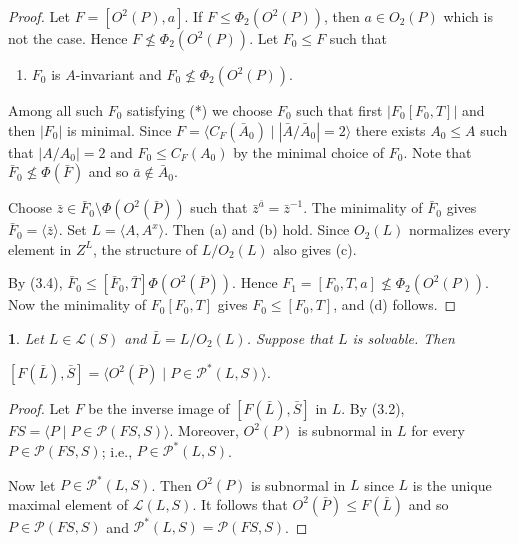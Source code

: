 \documentclass[11pt]{article}
\theoremstyle{plain}
\theoremstyle{stmplain}
\newtheorem{stm}{}[section]
\newcommand{\disp}[1]{\begin{center}$\displaystyle #1$\end{center}}
\begin{document}
\begin{proof}
Let $F = [O^2(P), a]$. If $F \le \Phi_2(O^2(P))$, then $a \in O_2(P)$ which is
not the case. Hence $F \nleq \Phi_2(O^2(P))$. Let $F_0 \le F$ such that
\begin{enumerate}
\item[(*)] $F_0$ is $A$-invariant and $F_0 \nleq \Phi_2(O^2(P))$.
\end{enumerate}
Among all such $F_0$ satisfying (*) we choose $F_0$ such that first
$|F_0[F_0, T]|$ and then $|F_0|$ is minimal. Since $F = \langle C_F(\bar{A}_0)
\mid |\bar{A}/\bar{A}_0| = 2 \rangle$ there exists $A_0 \le A$ such that
$|A/A_0| = 2$ and $F_0 \le C_F(A_0)$ by the minimal choice of $F_0$. Note that
$\bar{F}_0 \nleq \Phi(\bar{F})$ and so $\bar{a} \notin \bar{A}_0$.

\smallskip
\noindent Choose $\bar{z} \in \bar{F}_0 \setminus \Phi(O^2(\bar{P}))$ such that
$\bar{z}^{\bar{a}} = \bar{z}^{-1}$. The minimality of $\bar{F}_0$ gives
$\bar{F}_0 = \langle \bar{z} \rangle$. Set $L = \langle A, A^x \rangle$. Then
(a) and (b) hold. Since $O_2(L)$ normalizes every element in $Z^L$, the
structure of $L/O_2(L)$ also gives (c).

\smallskip
\noindent By (3.4), $\bar{F}_0 \le [\bar{F}_0, \bar{T}]\Phi(O^2(\bar{P}))$. Hence
$F_1 = [F_0, T, a] \nleq \Phi_2(O^2(P))$. Now the minimality of $F_0[F_0, T]$
gives $F_0 \le [F_0, T]$, and (d) follows.
\end{proof}

\begin{stm}\label{st:3.7}
Let $L \in \mathcal{L}(S)$ and $\bar{L} = L/O_2(L)$. Suppose that $L$ is
solvable. Then
\disp{[F(\bar{L}), \bar{S}] = \langle O^2(\bar{P}) \mid P \in \mathcal{P}^*(L, S) \rangle.}
\end{stm}

\begin{proof}
Let $F$ be the inverse image of $[F(\bar{L}), \bar{S}]$ in $L$. By (3.2), $FS =
\langle P \mid P \in \mathcal{P}(FS, S) \rangle$. Moreover, $O^2(P)$ is
subnormal in $L$ for every $P \in \mathcal{P}(FS, S)$; i.e., $P \in
\mathcal{P}^*(L, S)$.

\smallskip
\noindent Now let $P \in \mathcal{P}^*(L, S)$. Then $O^2(P)$ is subnormal in $L$
since $L$ is the unique maximal element of $\mathcal{L}(L, S)$. It follows that
$O^2(\bar{P}) \le F(\bar{L})$ and so $P \in \mathcal{P}(FS, S)$ and
$\mathcal{P}^*(L, S) = \mathcal{P}(FS, S)$.
\end{proof}
\end{document}

